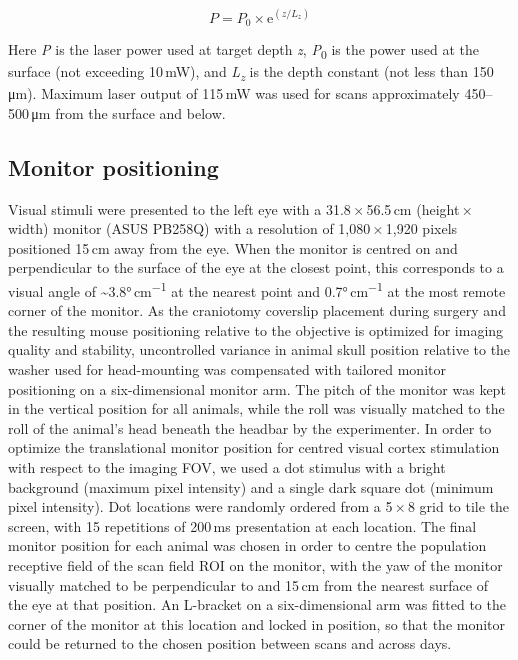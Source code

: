 \documentclass{article}
\begin{document}
\[ P = P_0 \times \mathrm{e}^{(z/L_z)} \]

Here \emph{P} is the laser power used at target depth \emph{z}, \emph{P}\textsubscript{0} is the power used at the surface (not exceeding 10\,mW), and \emph{L}\textsubscript{\emph{z}} is the depth constant (not less than 150\,μm). Maximum laser output of 115\,mW was used for scans approximately 450–500\,μm from the surface and below.

\subsection*{Monitor positioning}

Visual stimuli were presented to the left eye with a 31.8\,×\,56.5\,cm (height\,×\,width) monitor (ASUS PB258Q) with a resolution of 1,080\,×\,1,920 pixels positioned 15\,cm away from the eye. When the monitor is centred on and perpendicular to the surface of the eye at the closest point, this corresponds to a visual angle of \textasciitilde{}3.8°\,cm\textsuperscript{−1} at the nearest point and 0.7°\,cm\textsuperscript{−1} at the most remote corner of the monitor. As the craniotomy coverslip placement during surgery and the resulting mouse positioning relative to the objective is optimized for imaging quality and stability, uncontrolled variance in animal skull position relative to the washer used for head-mounting was compensated with tailored monitor positioning on a six-dimensional monitor arm. The pitch of the monitor was kept in the vertical position for all animals, while the roll was visually matched to the roll of the animal’s head beneath the headbar by the experimenter. In order to optimize the translational monitor position for centred visual cortex stimulation with respect to the imaging FOV, we used a dot stimulus with a bright background (maximum pixel intensity) and a single dark square dot (minimum pixel intensity). Dot locations were randomly ordered from a 5\,×\,8 grid to tile the screen, with 15 repetitions of 200\,ms presentation at each location. The final monitor position for each animal was chosen in order to centre the population receptive field of the scan field ROI on the monitor, with the yaw of the monitor visually matched to be perpendicular to and 15\,cm from the nearest surface of the eye at that position. An L-bracket on a six-dimensional arm was fitted to the corner of the monitor at this location and locked in position, so that the monitor could be returned to the chosen position between scans and across days.
\end{document}
